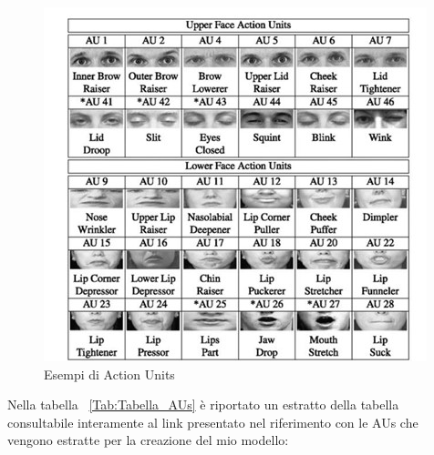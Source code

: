 \begin{figure}
    \begin{center}    
        \includegraphics[width=1\linewidth]{images/10.jpg}
        \caption{Esempi di Action Units}
    \end{center}
\end{figure}

\newpage

Nella tabella ~\ref{Tab:Tabella_AUs} è riportato un estratto della tabella consultabile interamente al link presentato nel riferimento \cite{PyFeat} con le AUs che vengono estratte per la creazione del mio modello:

\newpage

